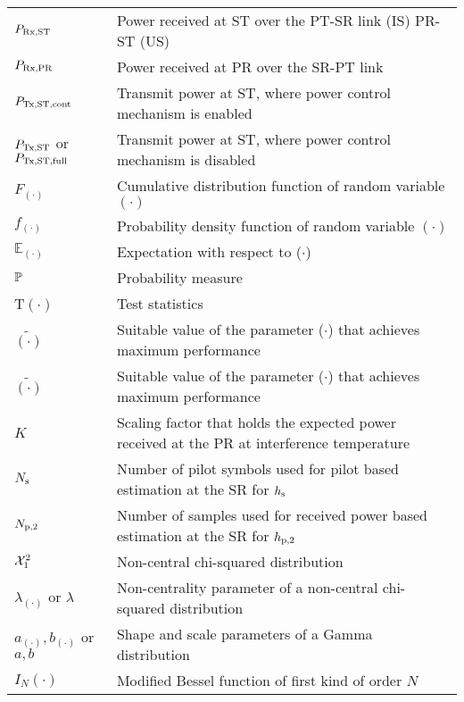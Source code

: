 \begin{longtable}{p{}p{}}


	$P_{\text{Rx,ST}}$  		&	Power received at ST over the PT-SR link (IS) PR-ST (US) \\ 
	$P_{\text{Rx,PR}}$  		&	Power received at PR over the SR-PT link \\

	$P_{\text{Tx,ST,cont}}$	  		&  	Transmit power at ST, where power control mechanism is enabled	\\
	$P_{\text{Tx,ST}}$ or $P_{\text{Tx,ST,full}}$	 	&  	Transmit power at ST, where power control mechanism is disabled	\\
	
       $F_{(\cdot)}$           &       Cumulative distribution function of random variable $(\cdot)$ \\
       $f_{(\cdot)}$           &       Probability density function of random variable $(\cdot)$ \\
       $\mathbb E_{(\cdot)}$   &       Expectation with respect to ($\cdot$) \\
       $\mathbb P$                    &       Probability measure \\
       T$(\cdot)$  	       &       Test statistics \\
       $\tilde{(\cdot)}$       &       Suitable value of the parameter ($\cdot$) that achieves maximum performance \\
       $\tilde{(\cdot)}$       &       Suitable value of the parameter ($\cdot$) that achieves maximum performance \\
       $K$                     &       Scaling factor that holds the expected power received at the PR at interference temperature  \\
       $N_{\text{s}}$                   &       Number of pilot symbols used for pilot based estimation at the SR for $h_{\text{s}}$ \\
       $N_{\text{p,2}}$                   &       Number of samples used for received power based estimation at the SR for $h_{\text{p,2}}$ \\
       $\ncchi2$               &       Non-central chi-squared distribution \\
       $\lambda_{(\cdot)}$ or $\lambda$       &       Non-centrality parameter of a non-central chi-squared distribution \\
       $a_{(\cdot)}, b_{(\cdot)}$ or $a, b$       &       Shape and scale parameters of a Gamma distribution \\

       $I_{N}(\cdot)$	       &	Modified Bessel function of first kind of order $N$ \\		
\end{longtable}
  



